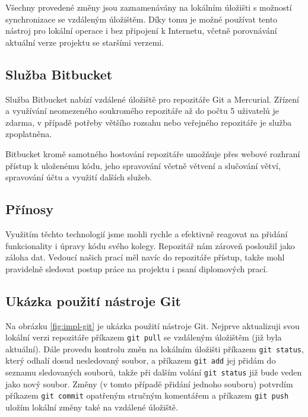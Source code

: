 \documentclass[thesis=M,czech]{FITthesis}[2012/06/26]
\begin{document}
Všechny provedené změny jsou zaznamenávány na lokálním úložišti s možností synchronizace se vzdáleným úložištěm. Díky 
tomu je možné používat tento nástroj pro lokální operace i bez připojení k Internetu, včetně porovnávání aktuální verze 
projektu se staršími verzemi. \cite{git}


\subsection{Služba Bitbucket}

Služba Bitbucket nabízí vzdálené úložiště pro repozitáře Git a Mercurial. Zřízení a využívání neomezeného soukromého repozitáře 
až do počtu 5 uživatelů je zdarma, v případě potřeby většího rozsahu nebo veřejného repozitáře je služba zpoplatněna.

Bitbucket kromě samotného hostování repozitáře umožňuje přes webové rozhraní přístup k uloženému kódu, jeho spravování 
včetně větvení a slučování větví, spravování účtu a využití dalších služeb. \cite{bitbucket}


\subsection{Přínosy}

Využitím těchto technologií jsme mohli rychle a efektivně reagovat na přidání funkcionality i úpravy kódu svého kolegy. 
Repozitář nám zároveň posloužil jako záloha dat. Vedoucí našich prací měl navíc do repozitáře přístup, takže mohl pravidelně 
sledovat postup práce na projektu i psaní diplomových prací.


\subsection{Ukázka použití nástroje Git}

Na obrázku \ref{fig:impl-git} je ukázka použití nástroje Git. Nejprve aktualizuji svou lokální verzi repozitáře příkazem \texttt{git pull} se vzdáleným 
úložištěm (již byla aktuální). Dále provedu kontrolu změn na lokálním úložišti příkazem \texttt{git status}, který odhalí dosud 
nesledovaný soubor, a příkazem \texttt{git add} jej přidám do seznamu sledovaných souborů, takže při dalším volání \texttt{git status} 
již bude veden jako nový soubor. Změny (v tomto případě přidání jednoho souboru) potvrdím příkazem \texttt{git commit} 
opatřeným stručným komentářem a příkazem \texttt{git push} uložím lokální změny také na vzdálené úložiště. 
\end{document}

